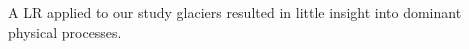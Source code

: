 \documentclass[twocolumn,letterpaper]{igs}
\begin{document}
A LR applied to our study glaciers resulted in little insight into dominant physical processes. 

%
%




%



\end{document}
